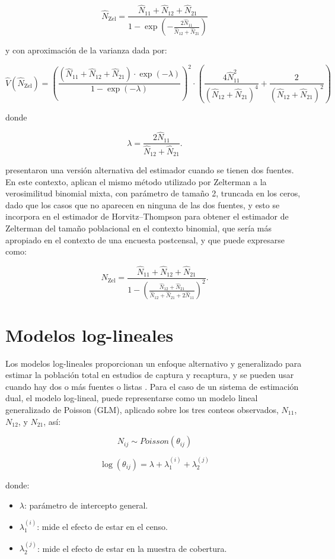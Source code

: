 \documentclass[
  12pt,
]{book}
\providecommand{\tightlist}{%
  \setlength{\itemsep}{0pt}\setlength{\parskip}{0pt}}
\begin{document}
\[
\hat{N}_{\text{Zel}} = \frac{\hat{N}_{11} + \hat{N}_{12} + \hat{N}_{21}}{1 - \exp\left(-\frac{2\hat{N}_{11}}{\hat{N}_{12} + \hat{N}_{21}}\right)}
\]

y con aproximación de la varianza dada por:

\[
\hat{V}(\hat{N}_{\text{Zel}}) = \left( \frac{(\hat{N}_{11} + \hat{N}_{12} + \hat{N}_{21}) \cdot \exp(-\lambda)}{1 - \exp(-\lambda)} \right)^2 \cdot \left( \frac{4 \hat{N}_{11}^2}{(\hat{N}_{12} + \hat{N}_{21})^4} + \frac{2}{(\hat{N}_{12} + \hat{N}_{21})^2} \right)
\]

donde

\[\lambda = \frac{2\hat{N}_{11}}{\hat{N}_{12} + \hat{N}_{21}}.\]

\citet{brittain2009estimators} presentaron una versión alternativa del estimador cuando se tienen dos fuentes. En este contexto, aplican el mismo método utilizado por Zelterman a la verosimilitud binomial mixta, con parámetro de tamaño 2, truncada en los ceros, dado que los casos que no aparecen en ninguna de las dos fuentes, y esto se incorpora en el estimador de Horvitz--Thompson para obtener el estimador de Zelterman del tamaño poblacional en el contexto binomial, que sería más apropiado en el contexto de una encuesta postcensal, y que puede expresarse como:

\[\hat{N}_{\text{Zel}} = \frac{\hat{N}_{11} + \hat{N}_{12} + \hat{N}_{21}}
{1 - \left(\frac{\hat{N}_{12}+\hat{N}_{21}}{\hat{N}_{12}+\hat{N}_{21}+2\hat{N}_{11}}\right)^2}.\]

\section{Modelos log-lineales}\label{modelos-log-lineales}

Los modelos log-lineales proporcionan un enfoque alternativo y generalizado para estimar la población total en estudios de captura y recaptura, y se pueden usar cuando hay dos o más fuentes o listas \citep{fienberg1972multiple, cormack1989log}. Para el caso de un sistema de estimación dual, el modelo log-lineal, puede representarse como un modelo lineal generalizado de Poisson (GLM), aplicado sobre los tres conteos observados, \(N_{11}\), \(N_{12}\), y \(N_{21}\), así:

\[N_{ij} \sim Poisson(\theta_{ij})\]

\[
\log(\theta_{ij}) = \lambda + \lambda_1^{(i)} + \lambda_2^{(j)}
\]

donde:

\begin{itemize}
\tightlist
\item
  \(\lambda\): parámetro de intercepto general.
\item
  \(\lambda_1^{(i)}\): mide el efecto de estar en el censo.
\item
  \(\lambda_2^{(j)}\): mide el efecto de estar en la muestra de cobertura.
\end{itemize}
\end{document}
